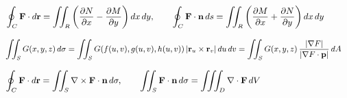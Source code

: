 \begin{center}
$\small{
\begin{array}{lll}
    \displaystyle \oint_C \mathbf F\cdot d\mathbf r 
    = \iint_R \left( \frac{\partial N}{\partial x} - \frac{\partial M}{\partial y} \right) dx\,dy , 
    & 
    & \displaystyle \oint_C \mathbf F\cdot \mathbf n \, ds
    = \iint_R \left( \frac{\partial M}{\partial x} + \frac{\partial N}{\partial y} \right) dx\,dy 
\end{array} 
}
$

$\small{
\begin{array}{l}
    \displaystyle \iint_S G(x,y,z) \, d\sigma 
    = \iint_S G(f(u,v),g(u,v),h(u,v)) \, |\mathbf r_u \times \mathbf r_v | \, du \, dv  
    = \iint_S G(x,y,z) \, \frac{|\nabla F|}{|\nabla F \cdot \mathbf p| } \, dA
\end{array} 
}
$

$\small{
\begin{array}{lll}
    \displaystyle \oint_C \mathbf F\cdot d\mathbf r 
    = \iint_S \nabla \times \mathbf F\cdot \mathbf n \, d\sigma  ,
    &
    & \displaystyle \iint_S \mathbf F\cdot \mathbf n \, d\sigma = \iiint _D \nabla \cdot \mathbf F \, dV
\end{array} 
}
$

\end{center}

\vspace{-8pt}